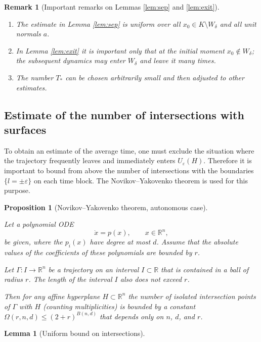 \documentclass[11pt]{article}
\newcommand{\eps}{\varepsilon}
\theoremstyle{thmstyleone}
\newtheorem{proposition}[theorem]{Proposition}
\newtheorem{lemma}[theorem]{Lemma}
\theoremstyle{thmstyletwo}
\newtheorem{remark}{Remark}
\theoremstyle{thmstylethree}
\begin{document}
\begin{appendices}
\begin{remark}[Important remarks on Lemmas \ref{lem:sep} and \ref{lem:exit}]
\begin{enumerate}
    \item The estimate in Lemma \ref{lem:sep} is uniform over all $x_0\in K\setminus W_\delta$ and all unit normals $a$.
    \item In Lemma \ref{lem:exit} it is important only that at the initial moment $x_0\notin W_\delta$; the subsequent dynamics may enter $W_\delta$ and leave it many times.
    \item The number $T_*$ can be chosen arbitrarily small and then adjusted to other estimates.
\end{enumerate}
\end{remark}

\subsection*{Estimate of the number of intersections with surfaces}

To obtain an estimate of the average time, one must exclude the situation where the trajectory frequently leaves and immediately enters $U_\eps(H)$. Therefore it is important to bound from above the number of intersections with the boundaries $\{l=\pm\eps\}$ on each time block. The Novikov–Yakovenko theorem is used for this purpose.

\begin{proposition}[Novikov–Yakovenko theorem, autonomous case]
\label{prop:novikov_yakovenko}\label{prop:novikov_yakovenko_2}

Let a polynomial ODE
\[
    \dot{x}=p(x), \qquad x \in \mathbb{R}^n,
\]
be given, where the $p_i(x)$ have degree at most $d$. Assume that the absolute values of the coefficients of these polynomials are bounded by $r$.

Let $\Gamma: I \to \mathbb{R}^n$ be a trajectory on an interval $I \subset \mathbb{R}$ that is contained in a ball of radius $r$. The length of the interval $I$ also does not exceed $r$.

Then for any affine hyperplane $H \subset \mathbb{R}^n$ the number of isolated intersection points of $\Gamma$ with $H$ (counting multiplicities) is bounded by a constant $\Omega(r, n, d) \le (2 + r)^{B(n,d)}$ that depends only on $n$, $d$, and $r$.
\end{proposition}

\begin{lemma}[Uniform bound on intersections]
\label{lem:intersect}\label{lem:intersect_2}


\end{lemma}
\end{appendices}
\end{document}

